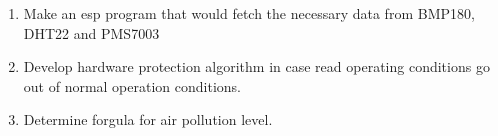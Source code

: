 \documentclass{article}
\begin{document}
			\begin{enumerate}
				\item Make an esp program that would fetch the necessary data from BMP180, DHT22 and PMS7003
				\item Develop hardware protection algorithm in case read operating conditions go out of normal operation conditions.
				\item Determine forgula for air pollution level.
			\end{enumerate}

	\newpage
	 
	
		
\end{document}
